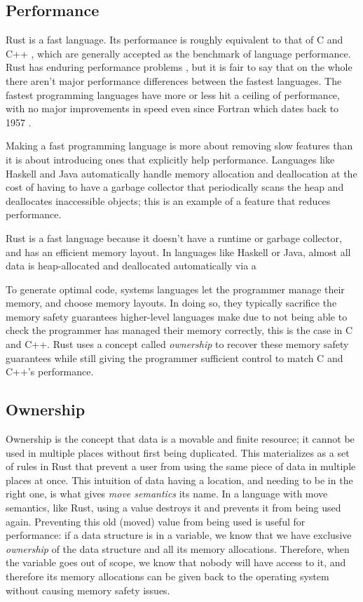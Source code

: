 \documentclass[12pt,twoside]{report}
\begin{document}
\subsection{Performance}
Rust is a fast language. Its performance is roughly equivalent to that of C and C++ \cite{BenchmarksGame}, which are generally accepted as the benchmark of language performance. Rust has enduring performance problems \cite{RustStackEfficiency2022}, but it is fair to say that on the whole there aren't major performance differences between the fastest languages. The fastest programming languages have more or less hit a ceiling of performance, with no major improvements in speed even since Fortran \citep{GccVsClassic} which dates back to 1957 \cite[p. 16]{wilsonComparativeProgrammingLanguages2001}.

Making a fast programming language is more about removing slow features than it is about introducing ones that explicitly help performance. Languages like Haskell and Java automatically handle memory allocation and deallocation at the cost of having to have a garbage collector that periodically scans the heap and deallocates inaccessible objects; this is an example of a feature that reduces performance.

Rust is a fast language because it doesn't have a runtime or garbage collector, and has an efficient memory layout. In languages like Haskell or Java, almost all data is heap-allocated and deallocated automatically via a 

To generate optimal code, systems languages let the programmer manage their memory, and choose memory layouts. In doing so, they typically sacrifice the memory safety guarantees higher-level languages make due to not being able to check the programmer has managed their memory correctly, this is the case in C and C++. Rust uses a concept called \textit{ownership} to recover these memory safety guarantees while still giving the programmer sufficient control to match C and C++'s performance.

\subsection{Ownership}
Ownership is the concept that data is a movable and finite resource; it cannot be used in multiple places without first being duplicated. This materializes as a set of rules in Rust that prevent a user from using the same piece of data in multiple places at once. This intuition of data having a location, and needing to be in the right one, is what gives \textit{move semantics} its name. In a language with move semantics, like Rust, using a value destroys it and prevents it from being used again. Preventing this old (moved) value from being used is useful for performance: if a data structure is in a variable, we know that we have exclusive \textit{ownership} of the data structure and all its memory allocations. Therefore, when the variable goes out of scope, we know that nobody will have access to it, and therefore its memory allocations can be given back to the operating system without causing memory safety issues.
\end{document}
